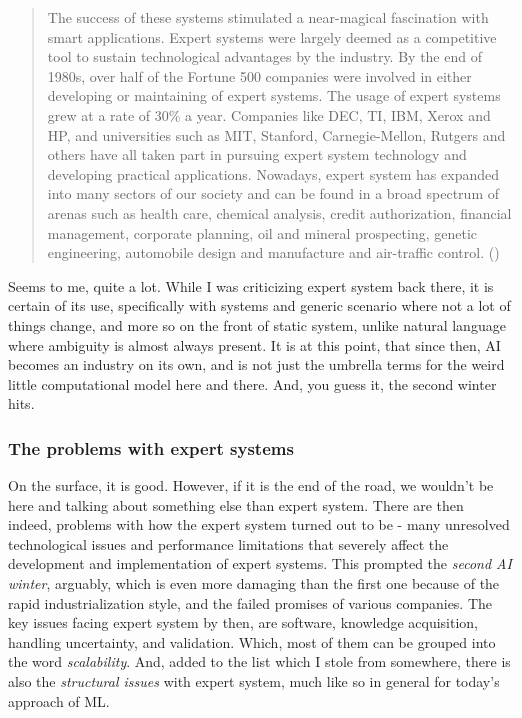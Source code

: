 \begin{quote}
    The success of these systems stimulated a near-magical fascination with smart applications. Expert systems were largely deemed as a competitive tool to sustain technological advantages by the industry. By the end of 1980s, over half of the Fortune 500 companies were involved in either developing or maintaining of expert systems. The usage of expert systems grew at a rate of 30\% a year. Companies like DEC, TI, IBM, Xerox and HP, and universities such as MIT, Stanford, Carnegie-Mellon, Rutgers and others have all taken part in pursuing expert system technology and developing practical applications. Nowadays, expert system has expanded into many sectors of our society and can be found in a broad spectrum of arenas such as health care, chemical analysis, credit authorization, financial management, corporate planning, oil and mineral prospecting, genetic engineering, automobile design and manufacture and air-traffic control. (\cite{10.5555/1671238})
\end{quote}

Seems to me, quite a lot. While I was criticizing expert system back there, it is certain of its use, specifically with systems and generic scenario where not a lot of things change, and more so on the front of static system, unlike natural language where ambiguity is almost always present. It is at this point, that since then, AI becomes an industry on its own, and is not just the umbrella terms for the weird little computational model here and there. And, you guess it, the second winter hits.
\subsubsection{The problems with expert systems}
On the surface, it is good. However, if it is the end of the road, we wouldn't be here and talking about something else than expert system. There are then indeed, problems with how the expert system turned out to be - many unresolved technological issues and performance limitations that severely affect the development and implementation of expert systems. This prompted the \textit{second AI winter}, arguably, which is even more damaging than the first one because of the rapid industrialization style, and the failed promises of various companies. The key issues facing expert system by then, are software, knowledge acquisition, handling uncertainty, and validation. Which, most of them can be grouped into the word \textit{scalability}. And, added to the list which I stole from somewhere, there is also the \textit{structural issues} with expert system, much like so in general for today's approach of ML. 

